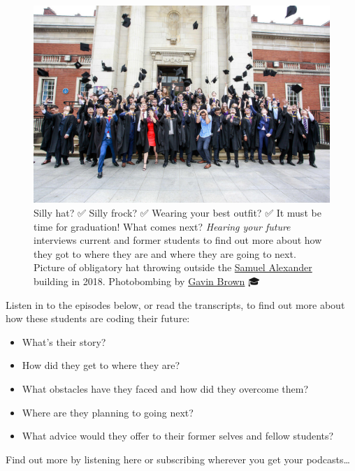 \documentclass[
]{book}
\providecommand{\tightlist}{%
  \setlength{\itemsep}{0pt}\setlength{\parskip}{0pt}}
\begin{document}
\begin{figure}

{\centering \includegraphics[width=1\linewidth]{images/graduation2} 

}

\caption{Silly hat? ✅ Silly frock? ✅ Wearing your best outfit? ✅ It must be time for graduation! What comes next? \emph{Hearing your future} interviews current and former students to find out more about how they got to where they are and where they are going to next. Picture of obligatory hat throwing outside the \href{https://en.wikipedia.org/wiki/Samuel_Alexander}{Samuel Alexander} building in 2018. Photobombing by \href{https://profgavinbrown.github.io/}{Gavin Brown} 🎓}\label{fig:graduation-fig}
\end{figure}



Listen in to the episodes below, or read the transcripts, to find out more about how these students are coding their future:

\begin{itemize}
\tightlist
\item
  What's their story?\\
\item
  How did they get to where they are?
\item
  What obstacles have they faced and how did they overcome them?
\item
  Where are they planning to going next?
\item
  What advice would they offer to their former selves and fellow students?
\end{itemize}

Find out more by listening here or subscribing wherever you get your podcasts\ldots{}
\end{document}
